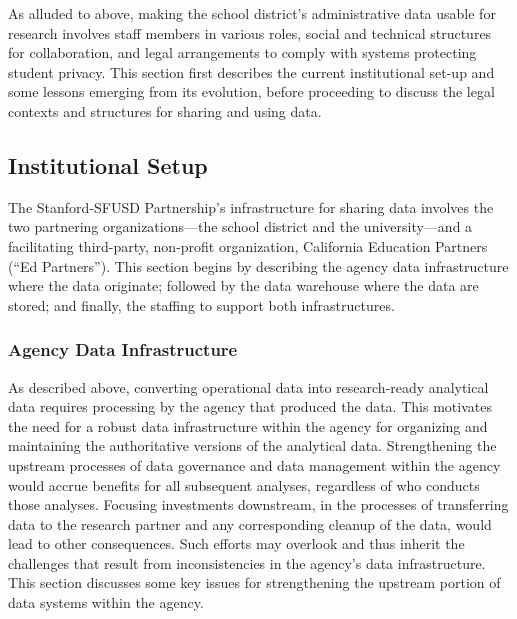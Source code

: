 \documentclass[
]{book}
\begin{document}
As alluded to above, making the school district's administrative data usable for research involves staff members in various roles, social and technical structures for collaboration, and legal arrangements to comply with systems protecting student privacy. This section first describes the current institutional set-up and some lessons emerging from its evolution, before proceeding to discuss the legal contexts and structures for sharing and using data.

\hypertarget{institutional-setup-5}{%
\subsection{Institutional Setup}\label{institutional-setup-5}}

The Stanford-SFUSD Partnership's infrastructure for sharing data involves the two partnering organizations---the school district and the university---and a facilitating third-party, non-profit organization, California Education Partners (``Ed Partners''). This section begins by describing the agency data infrastructure where the data originate; followed by the data warehouse where the data are stored; and finally, the staffing to support both infrastructures.

\hypertarget{agency-data-infrastructure}{%
\subsubsection{Agency Data Infrastructure}\label{agency-data-infrastructure}}

As described above, converting operational data into research-ready analytical data requires processing by the agency that produced the data. This motivates the need for a robust data infrastructure within the agency for organizing and maintaining the authoritative versions of the analytical data. Strengthening the upstream processes of data governance and data management within the agency would accrue benefits for all subsequent analyses, regardless of who conducts those analyses. Focusing investments downstream, in the processes of transferring data to the research partner and any corresponding cleanup of the data, would lead to other consequences. Such efforts may overlook and thus inherit the challenges that result from inconsistencies in the agency's data infrastructure. This section discusses some key issues for strengthening the upstream portion of data systems within the agency.
\end{document}
